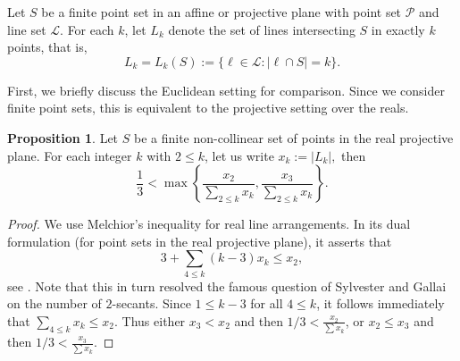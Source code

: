 \documentclass[10pt]{article}
\newcommand{\cP}{\mathcal{P}}
\newcommand{\cL}{\mathcal{L}}
\theoremstyle{definition}
\newtheorem{proposition}[thm]{Proposition}
\newcommand{\zs}[1]{\textcolor{magenta}{\textbf{#1}}}
\newcommand{\zsst}[1]{%
	\bgroup
	\markoverwith{\textcolor{magenta}{\rule[0.5ex]{2pt}{1.2pt}}}%
	\ULon{#1}%
	\egroup
}
\begin{document}
	
	
	Let $S$ be a finite point set in an affine or projective plane with point set $\cP$ and line set $\cL$. For each $k$, let  $L_k$ denote the set of lines  intersecting $S$ in exactly $k$ points, that is, \[
	L_k = L_k(S) := \{\ell\in \cL : |\ell \cap S| = k\}.
	\]
	
	First, we briefly discuss the Euclidean setting for comparison. Since we consider finite point sets, this is equivalent to the projective setting over the reals.
	
	\begin{proposition}\label{prop:melchior_ratio}
		Let $S$ be a finite non-collinear set of points in the real projective plane. 
		For each integer \(k\) with \(2\le k\), let
		us write
		$
		x_k := |L_k|, 
		$
		then
		\[
		\ensuremath{\frac{1}{3}<\max\left\{\frac{x_2}{ \sum_{2\le k} x_k},\frac{x_3}{ \sum_{2\le k} x_k}\right\}}.
		\]
		
	\end{proposition}
	
	\begin{proof}
		We use Melchior's inequality for real line arrangements. In its dual formulation 
		(for point sets in the real projective plane), it asserts that
		\begin{equation}\label{eq:melchior}
			\ensuremath{3 + \sum_{4\le k}(k-3)x_k\le x_2},
		\end{equation}
		see \cite{ Hirzebruch1986, Melchior1941, PachAgarwal1995}.
		Note that this in turn resolved the famous question of Sylvester and Gallai on the number of $2$-secants.
		Since \(1\le k-3\) for all \(4\le k\), it follows immediately that
		$
		\ensuremath{\sum_{4\le k}x_k\le x_2}.$
		Thus either \(x_3<x_2\) and then \(1/3<\frac{x_2}{\sum x_k}\), or $x_2\le x_3$ and then \(1/3<\frac{x_3}{\sum x_k}\).
	\end{proof}
	
\end{document}
